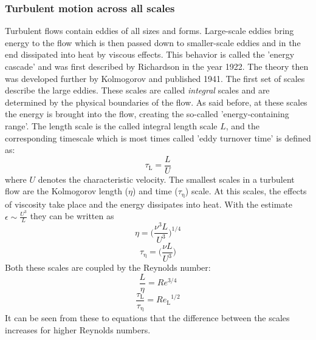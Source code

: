 \documentclass[11pt,a4paper,openany,oneside,parskip=half*]{article}
\begin{document}
\subsubsection{Turbulent motion across all scales}
Turbulent flows contain eddies of all sizes and forms. Large-scale eddies bring energy to the flow which is then passed down to smaller-scale eddies and in the end dissipated into heat by viscous effects. This behavior is called the 'energy cascade' and was first described by Richardson in the year 1922. The theory then was developed further by Kolmogorov and published 1941.
\newline
The first set of scales describe the large eddies. These scales are called \textit{integral} scales and are determined by the physical boundaries of the flow. As said before, at these scales the energy is brought into the flow, creating the so-called 'energy-containing range'. The length scale is the called integral length scale $L$, and the corresponding timescale which is most times called 'eddy turnover time' is defined as:
\begin{equation}
\tau_\mathrm{L} = \frac{L}{U}
\end{equation}
where $U$ denotes the characteristic velocity.
\newline
The smallest scales in a turbulent flow are the Kolmogorov length ($\eta$) and time ($\tau_\mathrm{\eta}$) scale. At this scales, the effects of viscosity take place and the energy dissipates into heat. With the estimate $\epsilon \sim \frac{U^3}{L} $ they can be written as
\begin{equation}
\eta = \biggl (\frac{\nu^3 L}{U^3} \biggl )^{1/4}
\end{equation}
\begin{equation}
\tau_\mathrm{\eta} = \biggl (\frac{\nu L}{U^3} \biggl )
\end{equation}
Both these scales are coupled by the Reynolds number:
\begin{equation}
\frac{L}{\eta} = Re^{3/4}
\end{equation}
\begin{equation}
\frac{\tau_\mathrm{L}}{\tau_\mathrm{\eta}} = {Re_\mathrm{L}}^{1/2}
\end{equation}
It can be seen from these to equations that the difference between the scales increases for higher Reynolds numbers. 
\end{document}
